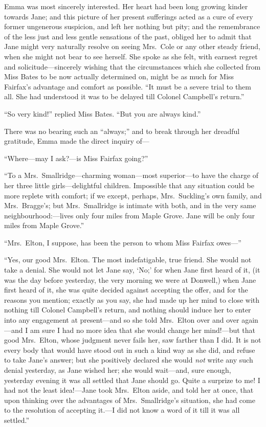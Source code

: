Emma was most sincerely interested.  Her heart had been long growing
kinder towards Jane; and this picture of her present sufferings acted
as a cure of every former ungenerous suspicion, and left her nothing
but pity; and the remembrance of the less just and less gentle
sensations of the past, obliged her to admit that Jane might very
naturally resolve on seeing Mrs.\ Cole or any other steady friend,
when she might not bear to see herself.  She spoke as she felt,
with earnest regret and solicitude---sincerely wishing that the
circumstances which she collected from Miss Bates to be now actually
determined on, might be as much for Miss Fairfax's advantage
and comfort as possible.  ``It must be a severe trial to them all.
She had understood it was to be delayed till Colonel Campbell's return.''

``So very kind!'' replied Miss Bates.  ``But you are always kind.''

There was no bearing such an ``always;'' and to break through her
dreadful gratitude, Emma made the direct inquiry of---%

``Where---may I ask?---is Miss Fairfax going?''

``To a Mrs.\ Smallridge---charming woman---most superior---to have
the charge of her three little girls---delightful children.
Impossible that any situation could be more replete with comfort;
if we except, perhaps, Mrs.\ Suckling's own family, and Mrs.\ Bragge's;
but Mrs.\ Smallridge is intimate with both, and in the very
same neighbourhood:---lives only four miles from Maple Grove.
Jane will be only four miles from Maple Grove.''

``Mrs.\ Elton, I suppose, has been the person to whom Miss Fairfax owes---''

``Yes, our good Mrs.\ Elton.  The most indefatigable, true friend.
She would not take a denial.  She would not let Jane say, `No;' for
when Jane first heard of it, (it was the day before yesterday,
the very morning we were at Donwell,) when Jane first heard of it,
she was quite decided against accepting the offer, and for the
reasons you mention; exactly as you say, she had made up her mind
to close with nothing till Colonel Campbell's return, and nothing
should induce her to enter into any engagement at present---and so she
told Mrs.\ Elton over and over again---and I am sure I had no more
idea that she would change her mind!---but that good Mrs.\ Elton,
whose judgment never fails her, saw farther than I did.  It is not
every body that would have stood out in such a kind way as she did,
and refuse to take Jane's answer; but she positively declared she
would \emph{not} write any such denial yesterday, as Jane wished her;
she would wait---and, sure enough, yesterday evening it was all
settled that Jane should go.  Quite a surprize to me!  I had not
the least idea!---Jane took Mrs.\ Elton aside, and told her at once,
that upon thinking over the advantages of Mrs.\ Smallridge's situation,
she had come to the resolution of accepting it.---I did not know a word
of it till it was all settled.''

